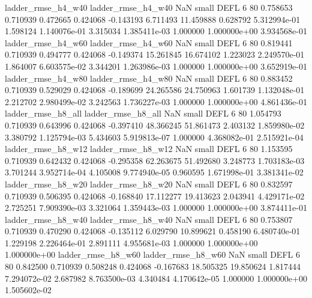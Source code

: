       ladder_rmse_h4_w40       ladder_rmse_h4_w40                   NaN      small     DEFL                 6 80 0.758653       0.710939 0.472665       0.424068   -0.143193      6.711493     11.459888     0.628792   5.312994e-01  1.598124 1.140076e-01     3.315034   1.385411e-03            1.000000    1.000000e+00        3.934568e-01
      ladder_rmse_h4_w60       ladder_rmse_h4_w60                   NaN      small     DEFL                 6 80 0.819441       0.710939 0.494777       0.424068   -0.149374     15.261845     16.674102     1.223023   2.249570e-01  1.864007 6.603575e-02     3.344201   1.263986e-03            1.000000    1.000000e+00        3.652919e-01
      ladder_rmse_h4_w80       ladder_rmse_h4_w80                   NaN      small     DEFL                 6 80 0.883452       0.710939 0.529029       0.424068   -0.189699     24.265586     24.750963     1.601739   1.132048e-01  2.212702 2.980499e-02     3.242563   1.736227e-03            1.000000    1.000000e+00        4.861436e-01
      ladder_rmse_h8_all       ladder_rmse_h8_all                   NaN      small     DEFL                 6 80 1.054793       0.710939 0.643996       0.424068   -0.397410     48.366245     51.861473     2.403132   1.859980e-02  3.380792 1.125794e-03     5.434603   5.919813e-07            1.000000    4.368082e-01        2.515921e-04
      ladder_rmse_h8_w12       ladder_rmse_h8_w12                   NaN      small     DEFL                 6 80 1.153595       0.710939 0.642432       0.424068   -0.295358     62.263675     51.492680     3.248773   1.703183e-03  3.701244 3.952714e-04     4.105008   9.774940e-05            0.960595    1.671998e-01        3.381341e-02
      ladder_rmse_h8_w20       ladder_rmse_h8_w20                   NaN      small     DEFL                 6 80 0.832597       0.710939 0.506395       0.424068   -0.168840     17.112277     19.413623     2.043941   4.429171e-02  2.725251 7.909390e-03     3.321064   1.359443e-03            1.000000    1.000000e+00        3.874411e-01
      ladder_rmse_h8_w40       ladder_rmse_h8_w40                   NaN      small     DEFL                 6 80 0.753807       0.710939 0.470290       0.424068   -0.135112      6.029790     10.899621     0.458190   6.480740e-01  1.229198 2.226464e-01     2.891111   4.955681e-03            1.000000    1.000000e+00        1.000000e+00
      ladder_rmse_h8_w60       ladder_rmse_h8_w60                   NaN      small     DEFL                 6 80 0.842500       0.710939 0.508248       0.424068   -0.167683     18.505325     19.850624     1.817444   7.294072e-02  2.687982 8.763500e-03     4.340484   4.170642e-05            1.000000    1.000000e+00        1.505602e-02

